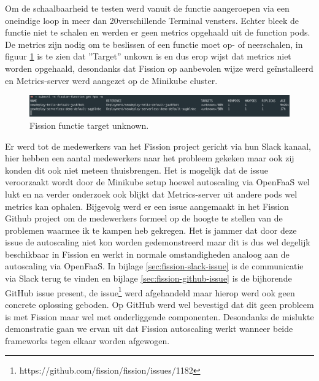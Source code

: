 Om de schaalbaarheid te testen werd vanuit de functie  aangeroepen via een oneindige loop in meer dan 20verschillende Terminal vensters. Echter bleek de functie niet te schalen en werden er geen metrics opgehaald uit de function pods. De metrics zijn nodig om te beslissen of een functie moet op- of neerschalen, in figuur \ref{fig:fission-scalability-issue} is te zien dat ''Target'' unkown is en dus erop wijst dat metrics niet worden opgehaald, desondanks dat Fission op aanbevolen wijze werd geïnstalleerd en Metrics-server werd aangezet op de Minikube cluster.
\begin{figure}
    \includegraphics[width=1\textwidth]{img/fission-scalability-issue.png}
    \caption{Fission functie target unknown.}
    \label{fig:fission-scalability-issue}  
\end{figure}

Er werd tot de medewerkers van het Fission project gericht via hun Slack kanaal, hier hebben een aantal medewerkers naar het probleem gekeken maar ook zij konden dit ook niet meteen thuisbrengen. Het is mogelijk dat de issue veroorzaakt wordt door de Minikube setup hoewel autoscaling via OpenFaaS wel lukt en na verder onderzoek ook blijkt dat Metrics-server uit andere pods wel metrics kan ophalen. Bijgevolg werd er een issue aangemaakt in het Fission Github project om de medewerkers formeel op de hoogte te stellen van de problemen waarmee ik te kampen heb gekregen. Het is jammer dat door deze issue de autoscaling niet kon worden gedemonstreerd maar dit is dus wel degelijk beschikbaar in Fission en werkt in normale omstandigheden analoog aan de autoscaling via OpenFaaS. In bijlage \ref{sec:fission-slack-issue} is de communicatie via Slack terug te vinden en bijlage \ref{sec:fission-github-issue} is de bijhorende GitHub issue present, de issue\footnote{https://github.com/fission/fission/issues/1182} werd afgehandeld maar hierop werd ook geen concrete oplossing geboden. Op GitHub werd wel bevestigd dat dit geen probleem is met Fission maar wel met onderliggende componenten. Desondanks de mislukte demonstratie gaan we ervan uit dat Fission autoscaling werkt wanneer beide frameworks tegen elkaar worden afgewogen.

